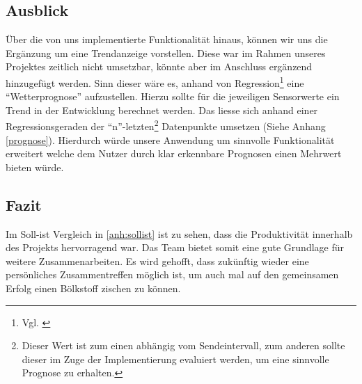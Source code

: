 \subsection{Ausblick}\label{subsec:ausblick}
Über die von uns implementierte Funktionalität hinaus, können wir uns die Ergänzung um eine Trendanzeige vorstellen.
Diese war im Rahmen unseres Projektes zeitlich nicht umsetzbar, könnte aber im Anschluss ergänzend hinzugefügt werden.
Sinn dieser wäre es, anhand von Regression\footnote{Vgl. \cite{regression}} eine \enquote{Wetterprognose} aufzustellen.
Hierzu sollte für die jeweiligen Sensorwerte ein Trend in der Entwicklung berechnet werden.
Das liesse sich anhand einer Regressionsgeraden der \enquote{n}-letzten\footnote{Dieser Wert ist zum einen abhängig vom Sendeintervall, zum anderen sollte dieser im Zuge der Implementierung evaluiert werden, um eine sinnvolle Prognose zu erhalten.} Datenpunkte umsetzen (Siehe Anhang \ref{prognose}).
Hierdurch würde unsere Anwendung um sinnvolle Funktionalität erweitert welche dem Nutzer durch klar erkennbare Prognosen einen Mehrwert bieten würde.

\subsection{Fazit}\label{subsec:fazit}
Im Soll-ist Vergleich in \autoref{anh:sollist} ist zu sehen, dass die Produktivität innerhalb des Projekts hervorragend war. Das Team bietet somit eine
gute Grundlage für weitere Zusammenarbeiten. Es wird gehofft, dass zukünftig wieder eine persönliches Zusammentreffen möglich ist,
um auch mal auf den gemeinsamen Erfolg einen Bölkstoff zischen zu können.


